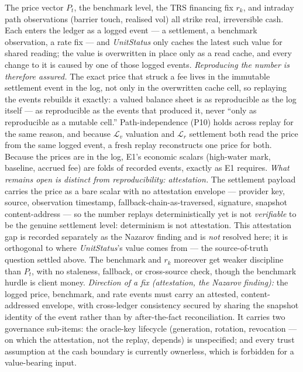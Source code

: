 \documentclass[11pt,a4paper]{article}
\begin{document}
\begin{description}[leftmargin=0pt,style=nextline]
\item[\textbf{E2 --- The observation surface is unattested (the linchpin).}]
The price vector $P_t$, the benchmark level, the TRS financing fix $r_k$, and intraday path
observations (barrier touch, realised vol) all strike real, irreversible cash. Each enters the
ledger as a logged event --- a settlement, a benchmark observation, a rate fix --- and
\textit{UnitStatus} only caches the latest such value for shared reading; the value is overwritten
in place only as a read cache, and every change to it is caused by one of those logged events.
\emph{Reproducing the number is therefore assured.} The exact price that struck a fee lives in the
immutable settlement event in the log, not only in the overwritten cache cell, so replaying the
events rebuilds it exactly: a valued balance sheet is as reproducible as the log itself --- as
reproducible as the events that produced it, never ``only as reproducible as a mutable cell.''
Path-independence (P10) holds across replay for the same reason, and because $\mathcal{L}_v$
valuation and $\mathcal{L}_r$ settlement both read the price from the same logged event, a fresh
replay reconstructs one price for both. Because the prices are in the log, E1's economic scalars
(high-water mark, baseline, accrued fee) are folds of recorded events, exactly as E1 requires.
\emph{What remains open is distinct from reproducibility: attestation.} The settlement payload
carries the price as a bare scalar with no attestation envelope --- provider key, source,
observation timestamp, fallback-chain-as-traversed, signature, snapshot content-address --- so the
number replays deterministically yet is not \emph{verifiable} to be the genuine settlement level:
determinism is not attestation. This attestation gap is recorded separately as the Nazarov
finding and is \emph{not} resolved here; it is orthogonal to where \textit{UnitStatus}'s value comes
from --- the source-of-truth question settled above.
The benchmark and $r_k$ moreover get weaker discipline than $P_t$, with no staleness, fallback, or
cross-source check, though the benchmark hurdle is client money. \emph{Direction of a fix
(attestation, the Nazarov finding):} the logged price, benchmark, and rate events must carry an
attested, content-addressed envelope, with cross-ledger consistency secured by sharing the snapshot
identity of the event rather than by after-the-fact reconciliation. It carries two governance
sub-items: the oracle-key lifecycle (generation, rotation, revocation --- on which the attestation,
not the replay, depends) is unspecified; and every trust assumption at the cash boundary is
currently ownerless, which is forbidden for a value-bearing input.


\end{description}
\end{document}
